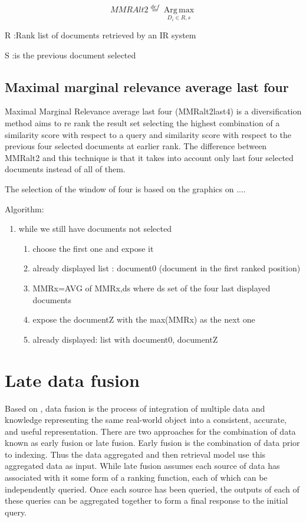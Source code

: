 \begin{equation}
MMRAlt2\overset{def}{=}\operatorname*{Arg \, \max}_{D_{i}\in R,s}
\end{equation}


R :Rank list of documents retrieved by an IR system

S :is the previous document selected


\subsection{Maximal marginal relevance average last four}

Maximal Marginal Relevance average last four (MMRalt2last4) is a diversification method aims to re rank the result set selecting the highest combination of a similarity score with respect to a query and similarity score with respect to the previous four selected documents at earlier rank. The difference between MMRalt2 and this technique is that it takes into account only last four selected documents instead of all of them.

The selection of the window of four is based on the graphics on ....

Algorithm:
\begin{enumerate}
\item while we still have documents not selected
	\begin{enumerate}
	\item choose the first one and expose it
	\item already displayed list : document0 (document in the first ranked position)
	\item MMRx=AVG of MMRx,ds where ds set of the four last displayed documents
	\item expose the documentZ with the max(MMRx) as the next one
	\item already displayed: list with document0, documentZ
	\end{enumerate}
\end{enumerate}


\section{Late data fusion}

Based on \cite{Wilkins}, data fusion is the process of integration of multiple data and knowledge representing the same real-world object into a consistent, accurate, and useful representation. There are two approaches for the combination of data known as early fusion or late fusion. Early fusion is the combination of data prior to indexing. Thus the data aggregated and then retrieval model use this aggregated data as input. While late fusion assumes each source of data has associated with it some form of a ranking function, each of which can be independently queried. Once each source has been queried, the outputs of each of these queries can be aggregated together to form a final response to the initial query.

